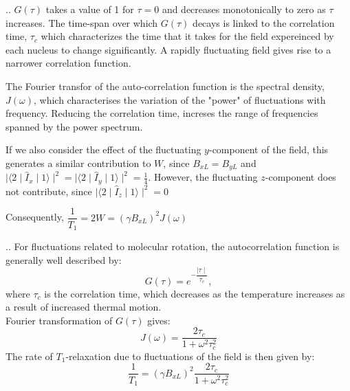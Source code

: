 \documentclass{beamer}
\begin{document}
\begin{frame}{\thesection.\thesubsection. \insertsubsection}
	$G(\tau)$ takes a value of 1 for $\tau = 0$ and decreases monotonically to zero as $\tau$ increases. The time-span over which $G(\tau)$ decays is linked to the correlation time, $\tau_c$ which characterizes the time that it takes for the field expereinced by each nucleus to change significantly. A rapidly fluctuating field gives rise to a narrower correlation function. 
	
	The Fourier transfor of the auto-correlation function is the \alert{spectral density}, $J(\omega)$, which characterises the variation of the "power" of fluctuations with frequency. Reducing the correlation time, increses the range of frequencies spanned by the power spectrum.
	
	If we also consider the effect of the fluctuating $y$-component of the field, this generates a similar contribution to $W$, since $B_{xL} = B_{yL}$ and $ \mid \langle 2 \mid \hat{I}_x \mid 1 \rangle \mid^2 = \mid \langle 2 \mid \hat{I}_y \mid 1 \rangle \mid^2 = \frac{1}{4}$. However, the fluctuating $z$-component does not contribute, since  $ \mid \langle 2 \mid \hat{I}_z \mid 1 \rangle \mid^2 = 0 $
	
	Consequently, $\dfrac{1}{T_1} = 2 W = (\gamma B_{xL})^2 J(\omega)$
\end{frame}

\begin{frame}{\thesection.\thesubsection. \insertsubsection}
	For fluctuations related to molecular rotation, the autocorrelation function is generally well described by:
	\begin{equation}
	G(\tau) = e^{- \dfrac{\mid \tau \mid}{\tau_c}},
	\end{equation}
	where $\tau_c$ is the correlation time, which decreases as the temperature increases as a result of increased thermal motion. \\
	Fourier transformation of $G(\tau)$ gives:
	\begin{equation}
	 J(\omega) = \dfrac{2 \tau_c}{1 + \omega^2 \tau_c^2}
	\end{equation}
	The rate of $T_1$-relaxation due to fluctuations of the field is then given by:
	\begin{equation}
	   \dfrac{1}{T_1} = (\gamma B_{xL})^2 \dfrac{2 \tau_c}{1 + \omega^2 \tau_c^2}
	\end{equation}

\end{frame}
\end{document}
